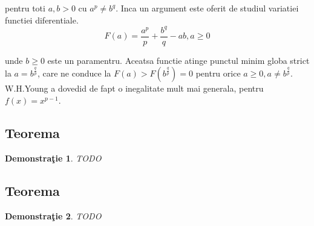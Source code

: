 \documentclass[a4paper,12pt,oneside]{report}
\newtheorem{demonstration}{Demonstra\c tie}
\begin{document}
pentru toti \(a,b>0\) cu \(a^{p}\neq b^{q}\). Inca un argument este oferit de studiul variatiei functiei diferentiale. 
\begin{displaymath}
  F\left ( a \right )= \frac{a^{p}}{p}+\frac{b^{q}}{q} - ab, a\geq 0
\end{displaymath}

unde \(b\geq 0\) este un paramentru. Aceatsa functie atinge punctul minim globa strict la \(a= b^{\frac{q}{p}}\), care ne conduce la \(F\left ( a \right )> F\left ( b^{\frac{q}{p}} \right ) = 0\) pentru orice \(a\geq 0, a\neq b^{\frac{q}{p}}\). 
	W.H.Young a dovedid de fapt  o inegalitate mult mai generala, pentru \(f\left ( x \right )=  x^{p-1}\).

\subsection{Teorema}


\begin{demonstration}
TODO	
\end{demonstration}

\subsection{Teorema}

\begin{demonstration}
TODO	
\end{demonstration}



%
%
%
%
\end{document}
